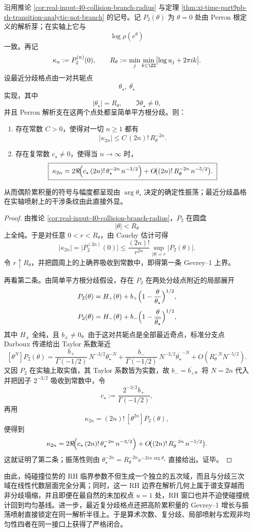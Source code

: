 \begin{theorem}\label{thm:xi-time-part9pb-branch-lattice-cumulant-gevrey-oscillation}
沿用推论 \ref{cor:real-input-40-collision-branch-radius} 与定理
\ref{thm:xi-time-part9pb-rh-transition-analytic-not-branch} 的记号。记 \(P_2(\theta)\) 为
\(\theta=0\) 处由 Perron 根定义的解析芽；在实轴上它与
\[
\log\rho(e^\theta)
\]
一致。再记
\[
\kappa_n:=P_2^{(n)}(0),
\qquad
R_\theta:=\min_j\min_{k\in\ZZ}\bigl|\log u_j+2\pi i k\bigr|.
\]
设最近分歧格点由一对共轭点
\[
\theta_\star,\ \overline{\theta_\star}
\]
实现，其中
\[
|\theta_\star|=R_\theta,
\qquad
\Im \theta_\star\neq 0,
\]
并且 Perron 解析支在这两个点处都呈简单平方根分歧。则：
\begin{enumerate}
  \item 存在常数 \(C>0\)，使得对一切 \(n\ge 1\) 都有
  \[
  \boxed{\;
  |\kappa_{2n}|
  \le
  C\,(2n)!\,R_\theta^{-2n}.\;}
  \]
  \item 存在复常数 \(c_\star\neq 0\)，使得当 \(n\to\infty\) 时，
  \[
  \boxed{\;
  \kappa_{2n}
  =
  2\Re\!\Bigl(
  c_\star\,(2n)!\,\theta_\star^{-2n}\,n^{-3/2}
  \Bigr)
  +O\!\bigl((2n)!\,R_\theta^{-2n}\,n^{-5/2}\bigr).\;}
  \]
\end{enumerate}
从而偶阶累积量的符号与幅度都呈现由 \(\arg\theta_\star\) 决定的确定性振荡；最近分歧晶格在实轴喷射上的干涉条纹由此直接外显。
\end{theorem}
\begin{proof}
由推论 \ref{cor:real-input-40-collision-branch-radius}，\(P_2\) 在圆盘
\[
|\theta|<R_\theta
\]
上全纯。于是对任意 \(0<r<R_\theta\)，由 Cauchy 估计可得
\[
|\kappa_{2n}|
=
\bigl|P_2^{(2n)}(0)\bigr|
\le
\frac{(2n)!}{r^{2n}}\sup_{|\theta|=r}|P_2(\theta)|.
\]
令 \(r\uparrow R_\theta\)，并把圆周上的上确界吸收到常数中，即得第一条 Gevrey--1 上界。

再看第二条。由简单平方根分歧假设，存在 \(P_2\) 在两处分歧点附近的局部展开
\[
P_2(\theta)
=
H_+(\theta)+b_+\Bigl(1-\frac{\theta}{\theta_\star}\Bigr)^{1/2},
\]
\[
P_2(\theta)
=
H_-(\theta)+b_-\Bigl(1-\frac{\theta}{\overline{\theta_\star}}\Bigr)^{1/2},
\]
其中 \(H_\pm\) 全纯，且 \(b_\pm\neq 0\)。由于这对共轭点是全部最近奇点，标准分支点 Darboux 传递给出 Taylor 系数渐近
\[
[\theta^N]P_2(\theta)
=
\frac{b_+}{\Gamma(-1/2)}\,N^{-3/2}\theta_\star^{-N}
+\frac{b_-}{\Gamma(-1/2)}\,N^{-3/2}\overline{\theta_\star}^{-N}
+O(R_\theta^{-N}N^{-5/2}).
\]
又因 \(P_2\) 在实轴上取实值，其 Taylor 系数皆为实数，故 \(b_-=\overline{b_+}\)。将 \(N=2n\) 代入并把因子 \(2^{-3/2}\) 吸收到常数中，令
\[
c_\star:=\frac{2^{-3/2}b_+}{\Gamma(-1/2)},
\]
再用
\[
\kappa_{2n}=(2n)!\,[\theta^{2n}]P_2(\theta),
\]
便得到
\[
\kappa_{2n}
=
2\Re\!\Bigl(
c_\star\,(2n)!\,\theta_\star^{-2n}\,n^{-3/2}
\Bigr)
+O\!\bigl((2n)!\,R_\theta^{-2n}\,n^{-5/2}\bigr).
\]
这就证明了第二条；振荡性则由 \(\theta_\star^{-2n}=R_\theta^{-2n}e^{-2in\arg\theta_\star}\) 直接给出。证毕。
\end{proof}

\noindent
由此，纯碰撞位势的 RH 临界参数不但生成一个独立的五次域，而且与分歧三次域在线性代数层面完全分离；同时，这一 RH 边界在解析几何上属于谱支穿越而非分歧塌缩，并且即便在最自然的未加权点 \(u=1\) 处，RH 窗口也并不迫使碰撞统计回到均匀基线。进一步，最近复分歧格点还把高阶累积量的 Gevrey--1 增长与振荡喷射直接锁定在同一解析半径上。于是算术次数、复分歧、局部喷射与宏观非均匀性四者在同一接口上获得了严格闭合。

\endinput
